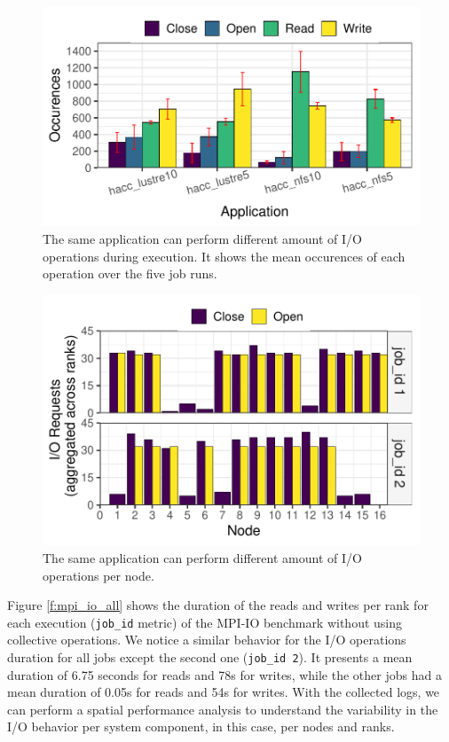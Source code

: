 \begin{figure}
	\centering
        \includegraphics[width=\linewidth]{figs/operations_hacc.pdf}
	\caption{The same application can perform different amount of
          I/O operations during execution. It shows the mean
          occurences of each operation over the five job runs.}
	\label{f:hacc}
\end{figure}

\begin{figure}
	\centering
        \includegraphics[width=\linewidth]{figs/hacc_nfs_10.pdf}
	\caption{The same application can perform different amount of
          I/O operations per node.}
	\label{f:hacc2}
\end{figure}

Figure \ref{f:mpi_io_all} shows the duration of the reads and writes
per rank for each execution (\texttt{job\_id} metric) of the MPI-IO
benchmark without using collective operations. We notice a similar
behavior for the I/O operations duration for all jobs except the
second one (\texttt{job\_id 2}). It presents a mean duration of 6.75
seconds for reads and 78s for writes, while the other jobs had a mean
duration of 0.05s for reads and 54s for writes. With the collected
logs, we can perform a spatial performance analysis to understand the
variability in the I/O behavior per system component, in this case,
per nodes and ranks.

